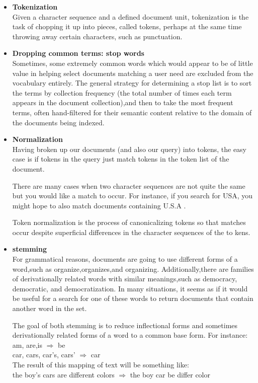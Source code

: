 \begin{itemize}
     \item \textbf{Tokenization}\\
     Given a character sequence and a defined document unit, tokenization is the
     task of chopping it up into pieces, called tokens, perhaps at the same time
     throwing away certain characters, such as punctuation.
     
     
     \item \textbf{Dropping common terms: stop words}\\
     Sometimes, some extremely common words which would appear to be of
     little value in helping select documents matching a user need are excluded
     from the vocabulary entirely.
     The general strategy for determining a stop list is to sort the terms by collection frequency (the total number of times each term appears in the document collection),and then to take the most frequent terms, often hand-filtered for their semantic content relative to the domain of the documents being indexed.
     
     
     \item  \textbf{Normalization}\\ 
     Having broken up our documents (and also our query) into tokens, the easy
     case is if tokens in the query just match tokens in the token list of the document.
     
     There are many cases when two character sequences are not quite the same but you would like a match to occur. For instance, if you search for USA, you might hope to also match documents containing U.S.A .
     
     Token normalization is the process of canonicalizing tokens so that matches occur despite superficial differences in the character sequences of the to kens.
    
    \item  \textbf{stemming}\\
    For grammatical reasons, documents are going to use different forms of a word,such as organize,organizes,and organizing. Additionally,there are families of derivationally related words with similar meanings,such as democracy, democratic, and democratization. In many situations, it seems as if it would be useful for a search for one of these words to return documents that contain another word in the set.
    
    The goal of both stemming is to reduce inflectional forms and sometimes derivationally related forms of a word to a common base form.
    For instance:\\
    am, are,is $\Rightarrow$  be \\
    car, cars, car's, cars' $\Rightarrow$  car \\
    The result of this mapping of text will be something like:\\
    the boy's cars are different colors  $\Rightarrow$   the  boy  car  be  differ   color
      
      
\end{itemize} 

